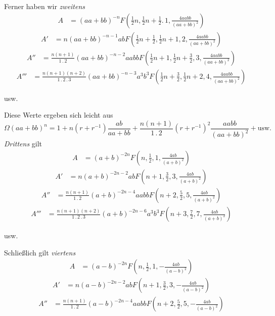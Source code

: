Ferner haben wir \textit{zweitens}
\[
\begin{array}{rl}
A&=(aa+bb)^{-n}F(\frac12 n,\frac12 n+\frac12 .\,1,\frac{4aabb}{(aa+bb)^2})
\end{array}
\]
\[
\begin{array}{rl}
A'&=n(aa+bb)^{-n-1}abF(\frac12 n+\frac12,\frac12 n+1,2,\frac{4aabb}{(aa+bb)^2})
\end{array}
\]
\[
\begin{array}{rl}
A''&=\frac{n(n+1)}{1\mathbin{.}2}(aa+bb)^{-n-2}aabbF(\frac12 n+1,\frac12 n+\frac32,3,\frac{4aabb}{(aa+bb)^2})
\end{array}
\]
\[
\begin{array}{rl}
A'''&=\frac{n(n+1)(n+2)}{1\mathbin{.}2\mathbin{.}3}(aa+bb)^{-n-3}a^3b^3F(\frac12 n+\frac32,\frac12 n+2,4,\frac{4aabb}{(aa+bb)^2})
\end{array}
\]
\begin{center}usw.\end{center}
Diese Werte ergeben sich leicht aus
\[
\Omega(aa+bb)^n=1+n(r+r^{-1})\frac{ab}{aa+bb}+\frac{n(n+1)}{1\mathbin{.}2}(r+r^{-1})^2\frac{aabb}{(aa+bb)^2}+\mathrm{usw.}
\]
\textit{Drittens} gilt
\[
\begin{array}{rl}
A&=(a+b)^{-2n}F(n,\frac12,1,\frac{4ab}{(a+b)^2})
\end{array}
\]
\[
\begin{array}{rl}
A'&=n(a+b)^{-2n-2}abF(n+1,\frac32,3,\frac{4ab}{(a+b)^2})
\end{array}
\]
\[
\begin{array}{rl}
A''&=\frac{n(n+1)}{1\mathbin{.}2}(a+b)^{-2n-4}aabbF(n+2,\frac52,5,\frac{4ab}{(a+b)^2})
\end{array}
\]
\[
\begin{array}{rl}
A'''&=\frac{n(n+1)(n+2)}{1\mathbin{.}2\mathbin{.}3}(a+b)^{-2n-6}a^3b^3F(n+3,\frac72,7,\frac{4ab}{(a+b)^2})
\end{array}
\]
\begin{center}usw.\end{center}
Schließlich gilt \textit{viertens}
\[
\begin{array}{rl}
A&=(a-b)^{-2n}F(n,\frac12,1,-\frac{4ab}{(a-b)^2})
\end{array}
\]
\[
\begin{array}{rl}
A'&=n(a-b)^{-2n-2}abF(n+1,\frac32,3,-\frac{4ab}{(a-b)^2})
\end{array}
\]
\[
\begin{array}{rl}
A''&=\frac{n(n+1)}{1\mathbin{.}2}(a-b)^{-2n-4}aabbF(n+2,\frac52,5,-\frac{4ab}{(a-b)^2})
\end{array}
\]
